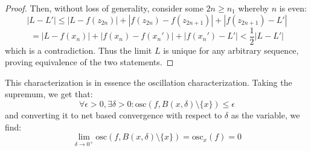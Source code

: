 \documentclass[10pt,letterpaper]{article} %
\begin{document}
\begin{proof}
Then, without loss of generality, consider some $2n \geqslant n_1$ whereby $n$ is even:
\begin{equation*}
|L - L'| \leqslant |L - f(z_{2n})| + |f(z_{2n}) -f(z_{2n+1})| + |f(z_{2n+1}) - L'|
\end{equation*}
\begin{equation*}
= |L - f(x_n)| + |f(x_n) - f(x_n')| + |f(x_n') - L'| < \frac{1}{2}|L - L'|
\end{equation*}
which is a contradiction. Thus the limit $L$ is unique for any arbitrary sequence, proving equivalence of the two statements.
\end{proof}
This characterization is in essence the oscillation characterization. Taking the supremum, we get that:
\begin{equation*}
\forall \epsilon > 0, \exists \delta > 0: \text{osc}(f, B(x, \delta)\setminus\{x\}) \leqslant \epsilon
\end{equation*}
and converting it to net based convergence with respect to $\delta$ as the variable, we find:
\begin{equation*}
\lim_{\delta \xrightarrow{} 0^+}\text{osc}(f, B(x, \delta)\setminus \{x\}) = \text{osc}_x(f) = 0
\end{equation*}
\end{document}
